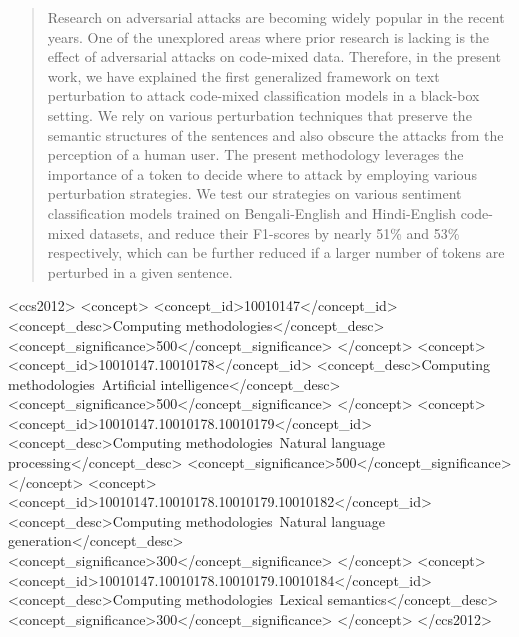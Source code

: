 \documentclass[sigconf]{acmart}
\begin{document}

\begin{abstract}
Research on adversarial attacks are becoming widely popular in the recent years. One of the unexplored areas where prior research is lacking is the effect of adversarial attacks on code-mixed data. Therefore, in the present work, we have explained the first generalized framework on text perturbation to attack code-mixed classification models in a black-box setting. We rely on various perturbation techniques that preserve the semantic structures of the sentences and also obscure the attacks from the perception of a human user. The present methodology leverages the importance of a token to decide where to attack by employing various perturbation strategies. We test our strategies on various sentiment classification models trained on Bengali-English and Hindi-English code-mixed datasets, and reduce their F1-scores by nearly 51\% and 53\% respectively, which can be further reduced if a larger number of tokens are perturbed in a given sentence. 
\end{abstract}

\begin{CCSXML}
<ccs2012>
   <concept>
       <concept_id>10010147</concept_id>
       <concept_desc>Computing methodologies</concept_desc>
       <concept_significance>500</concept_significance>
       </concept>
   <concept>
       <concept_id>10010147.10010178</concept_id>
       <concept_desc>Computing methodologies~Artificial intelligence</concept_desc>
       <concept_significance>500</concept_significance>
       </concept>
   <concept>
       <concept_id>10010147.10010178.10010179</concept_id>
       <concept_desc>Computing methodologies~Natural language processing</concept_desc>
       <concept_significance>500</concept_significance>
       </concept>
   <concept>
       <concept_id>10010147.10010178.10010179.10010182</concept_id>
       <concept_desc>Computing methodologies~Natural language generation</concept_desc>
       <concept_significance>300</concept_significance>
       </concept>
   <concept>
       <concept_id>10010147.10010178.10010179.10010184</concept_id>
       <concept_desc>Computing methodologies~Lexical semantics</concept_desc>
       <concept_significance>300</concept_significance>
       </concept>
 </ccs2012>
\end{CCSXML}
\end{document}

